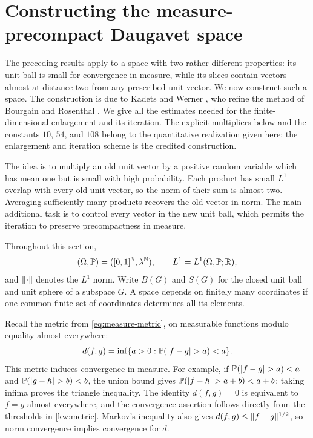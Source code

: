 \section{Constructing the measure-precompact Daugavet space}
\label{kw:section}

The preceding results apply to a space with two rather different
properties: its unit ball is small for convergence in measure, while
its slices contain vectors almost at distance two from any prescribed
unit vector.
We now construct such a space.  The construction is due to
Kadets and Werner \cite[Lemma~2.4 and Theorem~2.5]{KW2004}, who refine
the method of Bourgain and Rosenthal \cite{BourgainRosenthal1980}.
We give all the estimates needed for the finite-dimensional enlargement
and its iteration. The explicit multipliers below and the constants
$10$, $54$, and $108$ belong to the quantitative realization given here;
the enlargement and iteration scheme is the credited construction.

The idea is to multiply an old unit vector by a positive random variable
which has mean one but is small with high probability.  Each product has
small $L^1$ overlap with every old unit vector, so the norm of their sum is
almost two.  Averaging sufficiently many products recovers the old vector
in norm.  The main additional task is to control every vector in the
new unit ball, which permits the iteration to preserve precompactness
in measure.

Throughout this section,
\[
 (\Omega,\mathbb P)=([0,1]^{\mathbb N},\lambda^{\mathbb N}),
 \qquad L^1=L^1(\Omega,\mathbb P;\mathbb R),
\]
and $\lVert\cdot\rVert$ denotes the $L^1$ norm.  Write $B(G)$ and $S(G)$ for
the closed unit ball and unit sphere of a subspace $G$.  A space depends
on finitely many coordinates if one common finite set of coordinates
determines all its elements.

Recall the metric from \eqref{eq:measure-metric}, on measurable functions
modulo equality almost everywhere:
\begin{equation}\label{kw:metric}
 d(f,g)=\inf\{a>0:\mathbb P(\lvert f-g\rvert>a)<a\}.
\end{equation}
This metric induces convergence in measure.  For example, if
$\mathbb P(\lvert f-g\rvert>a)<a$ and $\mathbb P(\lvert g-h\rvert>b)<b$, the union bound gives
$\mathbb P(\lvert f-h\rvert>a+b)<a+b$; taking infima proves the triangle inequality.
The identity $d(f,g)=0$ is equivalent to $f=g$ almost everywhere, and
the convergence assertion follows directly from the thresholds in
\eqref{kw:metric}.  Markov's inequality also gives
$d(f,g)\le\lVert f-g\rVert^{1/2}$, so norm convergence implies convergence
for $d$.

